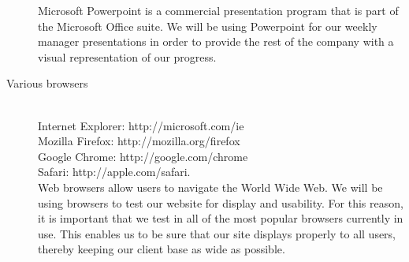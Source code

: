 \begin{description}
			Microsoft Powerpoint is a commercial presentation program that is part of the Microsoft Office suite. We will be using Powerpoint for our weekly manager presentations in order to provide the rest of the company with a visual representation of our progress.
		\item[Various browsers] \hfill \\
		Internet Explorer: http://microsoft.com/ie \\ Mozilla Firefox: http://mozilla.org/firefox\\Google Chrome: http://google.com/chrome\\Safari: http://apple.com/safari.\\
			Web browsers allow users to navigate the World Wide Web. We will be using browsers to test our website for display and usability. For this reason, it is important that we test in all of the most popular browsers currently in use. This enables us to be sure that our site displays properly to all users, thereby keeping our client base as wide as possible.
			
	\end{description}
